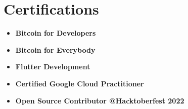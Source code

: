 \documentclass[letterpaper,11pt]{article}
\newcommand{\resumeItem}[1]{
  \item\small{{#1 \vspace{-2pt}}}
}
\newcommand{\resumeItemListStart}{\begin{itemize}}
\newcommand{\resumeItemListEnd}{\end{itemize}\vspace{-5pt}}
\begin{document}
\section{Certifications}
\begin{itemize}[leftmargin=0.15in, label={}]
\resumeItemListStart
\resumeItem{\textbf{Bitcoin for Developers}}
\resumeItem{\textbf{Bitcoin for Everybody}}
\resumeItem{\textbf{Flutter Development}}
\resumeItem{\textbf{Certified Google Cloud Practitioner}}
\resumeItem{\textbf{Open Source Contributor @Hacktoberfest 2022}}
\resumeItemListEnd
\end{itemize}
\end{document}
